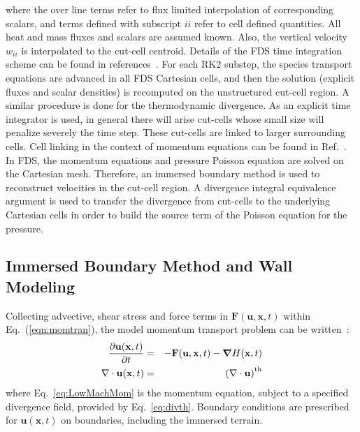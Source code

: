\documentclass[journal,article,atmosphere,submit,moreauthors,pdftex]{Definitions/mdpi}
\begin{document}
where the over line terms refer to flux limited interpolation of corresponding scalars, and terms defined with subscript $ii$ refer to cell defined quantities. All heat and mass fluxes and scalars are assumed known. Also, the vertical velocity $w_{ii}$ is interpolated to the cut-cell centroid. Details of the FDS time integration scheme can be found in references~\cite{FDS_Users_Guide,mcdermo_2014}. For each RK2 substep, the species transport equations are advanced in all FDS Cartesian cells, and then the solution (explicit fluxes and scalar densities) is recomputed on the unstructured cut-cell region. A similar procedure is done for the thermodynamic divergence.
As an explicit time integrator is used, in general there will arise cut-cells whose small size will penalize severely the time step. These cut-cells are linked to larger surrounding cells. Cell linking in the context of momentum equations can be found in Ref.~\cite{kirk_2003}. In FDS, the momentum equations and pressure Poisson equation are solved on the Cartesian mesh. Therefore, an immersed boundary method is used to reconstruct velocities in the cut-cell region. A divergence integral equivalence argument is used to transfer the divergence from cut-cells to the underlying Cartesian cells in order to build the source term of the Poisson equation for the pressure.


\subsection{Immersed Boundary Method and Wall Modeling}

Collecting advective, shear stress and force terms in $\mathbf{F}(\mathbf{u},\mathbf{x},t)$ within Eq.~(\ref{eqn:momtran}), the model momentum transport problem can be written~\cite{FDS_Users_Guide}:
\begin{eqnarray}
  \frac{\partial \mathbf{u}(\mathbf{x},t)}{\partial t} &=& - \mathbf{F}(\mathbf{u},\mathbf{x},t) - \boldsymbol{\nabla} H(\mathbf{x},t)  \label{eq:LowMachMom} \\
         \nabla \cdot \mathbf{u} (\mathbf{x},t) & = & \left(\nabla \cdot \mathbf{u} \right)^{\rm th} \label{eq:LowMachDiv}
\end{eqnarray}
where Eq.~\eqref{eq:LowMachMom} is the momentum equation, subject to a specified divergence field, provided by Eq.~\eqref{eq:divth}.
Boundary conditions are prescribed for $\mathbf{u}(\mathbf{x},t)$ on boundaries, including the immersed terrain.
\end{document}
